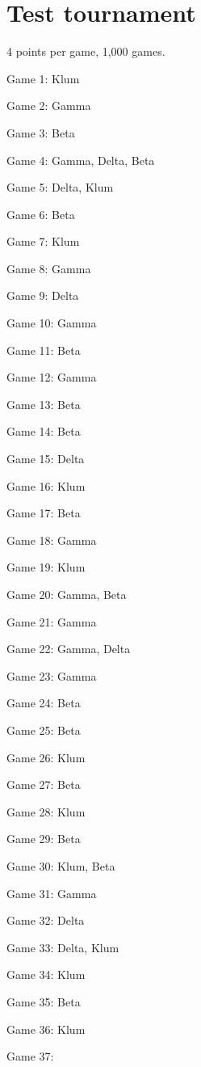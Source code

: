 \documentclass{article}
\begin{document}
\section{Test tournament}
4 points per game, 1,000 games.
\begin{multicols}{3}\raggedcolumns
\begin{compactitem}
\item Game 1:
Klum
\item Game 2:
Gamma
\item Game 3:
Beta
\item Game 4:
Gamma, Delta, Beta
\item Game 5:
Delta, Klum
\item Game 6:
Beta
\item Game 7:
Klum
\item Game 8:
Gamma
\item Game 9:
Delta
\item Game 10:
Gamma
\item Game 11:
Beta
\item Game 12:
Gamma
\item Game 13:
Beta
\item Game 14:
Beta
\item Game 15:
Delta
\item Game 16:
Klum
\item Game 17:
Beta
\item Game 18:
Gamma
\item Game 19:
Klum
\item Game 20:
Gamma, Beta
\item Game 21:
Gamma
\item Game 22:
Gamma, Delta
\item Game 23:
Gamma
\item Game 24:
Beta
\item Game 25:
Beta
\item Game 26:
Klum
\item Game 27:
Beta
\item Game 28:
Klum
\item Game 29:
Beta
\item Game 30:
Klum, Beta
\item Game 31:
Gamma
\item Game 32:
Delta
\item Game 33:
Delta, Klum
\item Game 34:
Klum
\item Game 35:
Beta
\item Game 36:
Klum
\item Game 37:

\end{compactitem}
\end{multicols}
\end{document}
